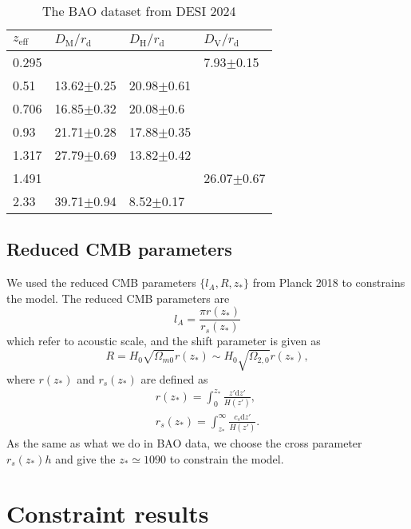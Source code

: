 \documentclass[twocolumn]{aastex631}
\begin{document}
   \begin{table}[htbp]
      \caption{The BAO dataset from DESI 2024}
      \centering
      \begin{tabular}{llll}
         \hline\hline
         $z_{\text{eff}}$ & $D_{\text{M}}/r_{\text{d}}$ & $D_{\text{H}}/r_{\text{d}}$ & $D_{\text{V}}/r_{\text{d}}$ \\
         \hline
         0.295 & & & 7.93$\pm$0.15 \\
         0.51 & 13.62$\pm$0.25 & 20.98$\pm$0.61 & \\
         0.706 & 16.85$\pm$0.32 & 20.08$\pm$0.6 & \\
         0.93 & 21.71$\pm$0.28 & 17.88$\pm$0.35 & \\
         1.317 & 27.79$\pm$0.69 & 13.82$\pm$0.42 & \\
         1.491 & & & 26.07$\pm$0.67 \\
         2.33 & 39.71$\pm$0.94 & 8.52$\pm$0.17 & \\
         \hline
      \end{tabular}
      \label{tab:3}
   \end{table}

\subsection{Reduced CMB parameters}

   We used the reduced CMB parameters $\{l_A,R,z_{*}\}$ from Planck 2018
   to constrains the model. The reduced CMB parameters are
   \begin{equation}
      l_A=\frac{\pi r(z_{*})}{r_s(z_{*})}
   \end{equation}
   which refer to acoustic scale, and the shift parameter is given as
   \begin{equation}
      R=H_0\sqrt{\Omega_{m0}}r(z_{*})\sim H_0\sqrt{\Omega_{2,0}}r(z_{*}),
   \end{equation}
   where $r(z_{*})$ and $r_s(z_{*})$ are defined as
   \begin{eqnarray}
      r(z_{*})=\int_0^{z_{*}}\frac{z'\mathrm{d}z'}{H(z')},\\
      r_s(z_{*})=\int_{z_{*}}^{\infty}\frac{c_s\mathrm{d}z'}{H(z')}.
   \end{eqnarray}
   As the same as what we do in BAO data, we choose the cross parameter
   $r_s(z_{*})h$ and give the $z_{*}\simeq1090$ to constrain the model.

\section{Constraint results}
\end{document}
